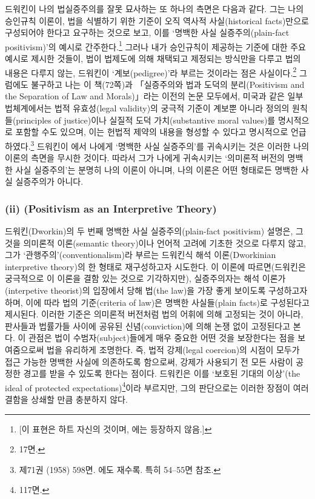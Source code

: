 드워킨이 나의 법실증주의를 잘못 묘사하는 또 하나의 측면은 다음과 같다.
그는 나의 승인규칙 이론이, 법을 식별하기 위한 기준이 오직 역사적
사실(historical facts)만으로 구성되어야 한다고 요구하는 것으로 보고,
이를 `명백한 사실 실증주의(plain-fact positivism)'의 예시로
간주한다.\footnote{{[}이 표현은 하트 자신의 것이며, 에는
  등장하지 않음.{]}} 그러나 내가 승인규칙이 제공하는 기준에 대한 주요
예시로 제시한 것들이, 법이 법제도에 의해 채택되고 제정되는 방식만을
다루고 법의 내용은 다루지 않는, 드워킨이 `계보(pedigree)'라 부르는
것이라는 점은 사실이다.\footnote{ 17면.} 그럼에도 불구하고
나는 이 책(72쪽)과 「실증주의와 법과 도덕의 분리(Positivism and the
Separation of Law and Morals)」라는 이전의 논문 모두에서, 미국과 같은
일부 법체계에서는 법적 유효성(legal validity)의 궁극적 기준이 계보뿐
아니라 정의의 원칙들(principles of justice)이나 실질적 도덕
가치(substantive moral values)를 명시적으로 포함할 수도 있으며, 이는
헌법적 제약의 내용을 형성할 수 있다고 명시적으로 언급하였다.\footnote{ 제71권 (1958) 598면. 에도 재수록. 특히 54--55면 참조.} 드워킨이 에서 나에게 `명백한 사실 실증주의'를 귀속시키는 것은 이러한 나의
이론의 측면을 무시한 것이다. 따라서 그가 나에게 귀속시키는 `의미론적
버전의 명백한 사실 실증주의'는 분명히 나의 이론이 아니며, 나의 이론은
어떤 형태로든 명백한 사실 실증주의가 아니다.

\subsubsection{\texorpdfstring{(ii) (Positivism as an Interpretive
Theory)}{(ii) 해석적 이론으로서의 실증주의(Positivism as an Interpretive Theory)}}\label{ii-uxd574uxc11duxc801-uxc774uxb860uxc73cuxb85cuxc11cuxc758-uxc2e4uxc99duxc8fcuxc758positivism-as-an-interpretive-theory}

드워킨(Dworkin)의 두 번째 명백한 사실 실증주의(plain-fact positivism)
설명은, 그것을 의미론적 이론(semantic theory)이나 언어적 고려에 기초한
것으로 다루지 않고, 그가 `관행주의'(conventionalism)라 부르는 드워킨식
해석 이론(Dworkinian interpretive theory)의 한 형태로 재구성하고자
시도한다. 이 이론에 따르면(드워킨은 궁극적으로 이 이론을 결함 있는
것으로 기각하지만), 실증주의자는 해석 이론가(interpetive theorist)의
입장에서 당해 법(the law)을 가장 좋게 보이도록 구성하고자 하며, 이에
따라 법의 기준(criteria of law)은 명백한 사실들(plain facts)로
구성된다고 제시된다. 이러한 기준은 의미론적 버전처럼 법의 어휘에 의해
고정되는 것이 아니라, 판사들과 법률가들 사이에 공유된 신념(conviction)에
의해 논쟁 없이 고정된다고 본다. 이 관점은 법이 수범자(subject)들에게
매우 중요한 어떤 것을 보장한다는 점을 보여줌으로써 법을 유리하게
조명한다. 즉, 법적 강제(legal coercion)의 시점이 모두가 접근 가능한
명백한 사실에 의존하도록 함으로써, 강제가 사용되기 전 모든 사람이 공정한
경고를 받을 수 있도록 한다는 점이다. 드워킨은 이를 `보호된 기대의
이상'(the ideal of protected expectations)\footnote{ 117면.}이라
부르지만, 그의 판단으로는 이러한 장점이 여러 결함을 상쇄할 만큼 충분하지
않다.

